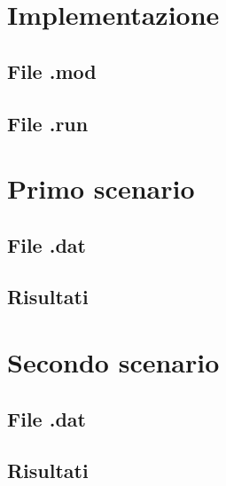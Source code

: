 \documentclass[12pt]{article}
\begin{document}
    \newpage
    \section{Implementazione}
    \subsection{File .mod}
    \subsection{File .run}
    \section{Primo scenario}
    \subsection{File .dat}
    \subsection{Risultati}
    \section{Secondo scenario}
    \subsection{File .dat}
    \subsection{Risultati}
\end{document}
